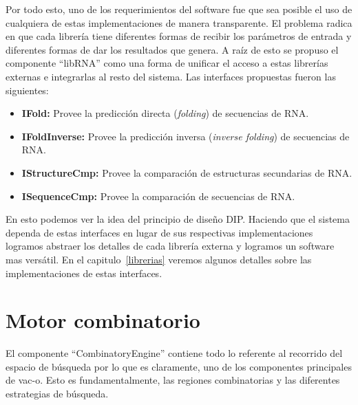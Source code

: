 Por todo esto, uno de los requerimientos del software fue que sea posible el uso
de cualquiera de estas implementaciones de manera transparente. El problema
radica en que cada librer\'ia tiene diferentes formas de recibir los
par\'ametros de entrada y diferentes formas de dar los resultados que genera. A
ra\'iz de esto se propuso el componente ``libRNA'' como una forma de unificar el
acceso a estas librer\'ias externas e integrarlas al resto del sistema. Las
interfaces propuestas fueron las siguientes:

\begin{itemize}
 \item \textbf{IFold:} Provee la predicci\'on directa (\textit{folding})
de secuencias de \ac{RNA}.
 \item \textbf{IFoldInverse:} Provee la predicci\'on inversa (\textit{inverse
folding}) de secuencias de \ac{RNA}.
 \item \textbf{IStructureCmp:} Provee la comparaci\'on de estructuras
secundarias
de \ac{RNA}.
 \item \textbf{ISequenceCmp:} Provee la comparaci\'on de secuencias de
\ac{RNA}.
\end{itemize}

En esto podemos ver la idea del principio de dise\~no \ac{DIP}. Haciendo que el
sistema dependa de estas interfaces en lugar de sus respectivas
implementaciones logramos abstraer los detalles de cada librer\'ia externa y
logramos un software mas vers\'atil. En el capitulo~\ref{librerias} veremos
algunos detalles sobre las implementaciones de estas interfaces.

\section{Motor combinatorio}

El componente ``CombinatoryEngine'' contiene todo lo referente al recorrido del
espacio de b\'usqueda por lo que es claramente, uno de los componentes
principales de \ac{vac-o}. Esto es fundamentalmente, las regiones
combinatorias y las diferentes estrategias de b\'usqueda.
